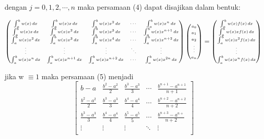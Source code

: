 \documentclass[a4paper,12pt]{article}
\begin{document}
\begin{enumerate}
dengan $j=0,1,2,\cdots,n$ maka persamaan (4) dapat disajikan dalam bentuk:
\begin{footnotesize}
	\begin{equation}
		{\fontsize{6}{10}\selectfont
		\begin{pmatrix}
			\int_{a}^{b} w(x)\, dx & \int_{a}^{b} w(x)x\, dx & \int_{a}^{b} w(x)x^2\, dx & \cdots & \int_{a}^{b} w(x)x^n\, dx\\
			\int_{a}^{b} w(x)x\, dx & \int_{a}^{b} w(x)x^2\, dx & \int_{a}^{b} w(x)x^3\, dx & \cdots & \int_{a}^{b} w(x)x^{n+1}\, dx\\
			\int_{a}^{b} w(x)x^2\, dx & \int_{a}^{b} w(x)x^3\, dx & \int_{a}^{b} w(x)x^4\, dx & \cdots & \int_{a}^{b} w(x)x^{n+2}\, dx\\
			\vdots & \vdots &  \vdots & \ddots & \vdots\\ 
			\int_{a}^{b} w(x)x^{n}\, dx & \int_{a}^{b} w(x)x^{n+1}\, dx & \int_{a}^{b} w(x)x^{n+2}\, dx & \cdots & \int_{a}^{b} w(x)x^{2n}\, dx
		\end{pmatrix}
		\begin{pmatrix}
			a_{0}\\
			a_{1}\\ 
			a_{2}\\
			\vdots\\ 
			a_{n}  
		\end{pmatrix}
		=
		\begin{pmatrix}
			\int_{a}^{b} w(x)f(x)\, dx\\
			\int_{a}^{b} w(x)xf(x)\, dx\\ 
			\int_{a}^{b} w(x)x^2f(x)\, dx\\
			\vdots\\ 
			\int_{a}^{b} w(x)x^nf(x)\, dx
		\end{pmatrix}
		}
	\end{equation}
\end{footnotesize}
jika w $\equiv 1$ maka persamaan (5) menjadi
{\fontsize{11}{11}\selectfont
	\begin{equation}
		\begin{bmatrix}
			b-a & \frac{b^2-a^2}{2} & \frac{b^3-a^3}{3} & \cdots & \frac{b^{n+1}-a^{n+1}}{n+1}\\
			\frac{b^2-a^2}{2} & \frac{b^3-a^3}{3} & \frac{b^4-a^4}{4} & \cdots & \frac{b^{n+2}-a^{n+2}}{n+2}\\
			\frac{b^3-a^3}{3} & \frac{b^4-a^4}{4} & \frac{b^5-a^5}{5} & \cdots & \frac{b^{n+3}-a^{n+}}{n+2}\\
			\vdots & \vdots &  \vdots & \ddots & \vdots\\ 

\end{bmatrix}
\end{equation}}
\end{enumerate}
\end{document}
